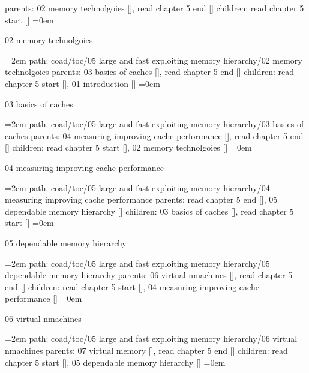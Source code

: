 parents:  02 memory technolgoies [], read chapter 5 end []
\smallskip
children: read chapter 5 start []
\smallskip
\leftskip=0em
\par\endgroup
\bigskip
{}
02 memory technolgoies
\smallskip
\par\begingroup
\leftskip=2em
path: coad/toc/05 large and fast exploiting memory hierarchy/02 memory technolgoies
\smallskip
parents:  03 basics of caches [], read chapter 5 end []
\smallskip
children: read chapter 5 start [], 01 introduction []
\smallskip
\leftskip=0em
\par\endgroup
\bigskip
{}
03 basics of caches
\smallskip
\par\begingroup
\leftskip=2em
path: coad/toc/05 large and fast exploiting memory hierarchy/03 basics of caches
\smallskip
parents:  04 measuring improving cache performance [], read chapter 5 end []
\smallskip
children: read chapter 5 start [], 02 memory technolgoies []
\smallskip
\leftskip=0em
\par\endgroup
\bigskip
{}
04 measuring improving cache performance
\smallskip
\par\begingroup
\leftskip=2em
path: coad/toc/05 large and fast exploiting memory hierarchy/04 measuring improving cache performance
\smallskip
parents:  read chapter 5 end [], 05 dependable memory hierarchy []
\smallskip
children: 03 basics of caches [], read chapter 5 start []
\smallskip
\leftskip=0em
\par\endgroup
\bigskip
{}
05 dependable memory hierarchy
\smallskip
\par\begingroup
\leftskip=2em
path: coad/toc/05 large and fast exploiting memory hierarchy/05 dependable memory hierarchy
\smallskip
parents:  06 virtual nmachines [], read chapter 5 end []
\smallskip
children: read chapter 5 start [], 04 measuring improving cache performance []
\smallskip
\leftskip=0em
\par\endgroup
\bigskip
{}
06 virtual nmachines
\smallskip
\par\begingroup
\leftskip=2em
path: coad/toc/05 large and fast exploiting memory hierarchy/06 virtual nmachines
\smallskip
parents:  07 virtual memory [], read chapter 5 end []
\smallskip
children: read chapter 5 start [], 05 dependable memory hierarchy []
\smallskip
\leftskip=0em
